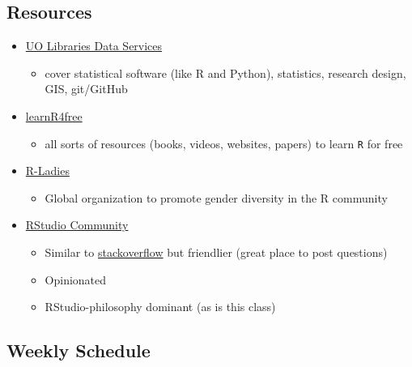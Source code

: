 \documentclass[
  letterpaper,
  DIV=11,
  numbers=noendperiod,
  oneside]{scrartcl}
\providecommand{\tightlist}{%
  \setlength{\itemsep}{0pt}\setlength{\parskip}{0pt}}\usepackage{longtable,booktabs,array}
\begin{document}
\hypertarget{resources}{%
\subsection{Resources}\label{resources}}

\begin{itemize}
\tightlist
\item
  \href{https://library.uoregon.edu/department-of-open-research/data-service}{UO
  Libraries Data Services}

  \begin{itemize}
  \tightlist
  \item
    cover statistical software (like R and Python), statistics, research
    design, GIS, git/GitHub
  \end{itemize}
\item
  \href{https://www.learnr4free.com/en/index.html}{learnR4free}

  \begin{itemize}
  \tightlist
  \item
    all sorts of resources (books, videos, websites, papers) to learn
    \texttt{R} for free
  \end{itemize}
\item
  \href{https://rladies.org/}{R-Ladies}

  \begin{itemize}
  \tightlist
  \item
    Global organization to promote gender diversity in the R community
  \end{itemize}
\item
  \href{https://community.rstudio.com/}{RStudio Community}

  \begin{itemize}
  \tightlist
  \item
    Similar to
    \href{https://stackoverflow.com/questions/tagged/r}{stackoverflow}
    but friendlier (great place to post questions)
  \item
    Opinionated
  \item
    RStudio-philosophy dominant (as is this class)
  \end{itemize}
\end{itemize}

\hypertarget{weekly-schedule}{%
\subsection{Weekly Schedule}\label{weekly-schedule}}
\end{document}
